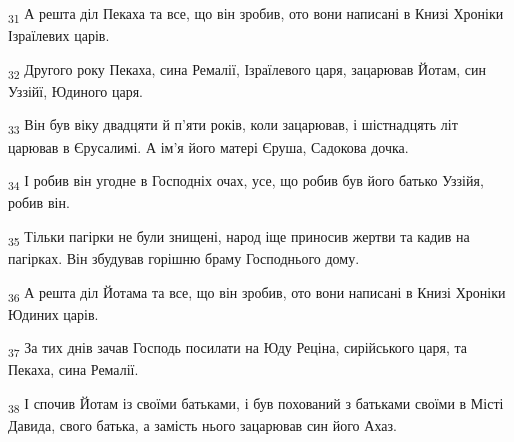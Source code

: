 \begin{tcolorbox}
\textsubscript{31} А решта діл Пекаха та все, що він зробив, ото вони написані в Книзі Хроніки Ізраїлевих царів.
\end{tcolorbox}
\begin{tcolorbox}
\textsubscript{32} Другого року Пекаха, сина Ремалії, Ізраїлевого царя, зацарював Йотам, син Уззійї, Юдиного царя.
\end{tcolorbox}
\begin{tcolorbox}
\textsubscript{33} Він був віку двадцяти й п'яти років, коли зацарював, і шістнадцять літ царював в Єрусалимі. А ім'я його матері Єруша, Садокова дочка.
\end{tcolorbox}
\begin{tcolorbox}
\textsubscript{34} І робив він угодне в Господніх очах, усе, що робив був його батько Уззійя, робив він.
\end{tcolorbox}
\begin{tcolorbox}
\textsubscript{35} Тільки пагірки не були знищені, народ іще приносив жертви та кадив на пагірках. Він збудував горішню браму Господнього дому.
\end{tcolorbox}
\begin{tcolorbox}
\textsubscript{36} А решта діл Йотама та все, що він зробив, ото вони написані в Книзі Хроніки Юдиних царів.
\end{tcolorbox}
\begin{tcolorbox}
\textsubscript{37} За тих днів зачав Господь посилати на Юду Реціна, сирійського царя, та Пекаха, сина Ремалії.
\end{tcolorbox}
\begin{tcolorbox}
\textsubscript{38} І спочив Йотам із своїми батьками, і був похований з батьками своїми в Місті Давида, свого батька, а замість нього зацарював син його Ахаз.
\end{tcolorbox}
